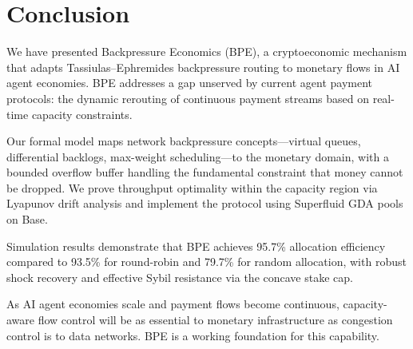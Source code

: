 \section{Conclusion}
\label{sec:conclusion}

We have presented Backpressure Economics (BPE), a cryptoeconomic mechanism that
adapts Tassiulas--Ephremides backpressure routing to monetary flows in AI agent
economies. BPE addresses a gap unserved by current agent payment protocols:
the dynamic rerouting of continuous payment streams based on real-time capacity
constraints.

Our formal model maps network backpressure concepts---virtual queues, differential
backlogs, max-weight scheduling---to the monetary domain, with a bounded overflow
buffer handling the fundamental constraint that money cannot be dropped. We prove
throughput optimality within the capacity region via Lyapunov drift analysis and
implement the protocol using Superfluid GDA pools on Base.

Simulation results demonstrate that BPE achieves 95.7\% allocation efficiency
compared to 93.5\% for round-robin and 79.7\% for random allocation, with robust
shock recovery and effective Sybil resistance via the concave stake cap.

As AI agent economies scale and payment flows become continuous, capacity-aware
flow control will be as essential to monetary infrastructure as congestion control
is to data networks. BPE is a working foundation for this capability.
